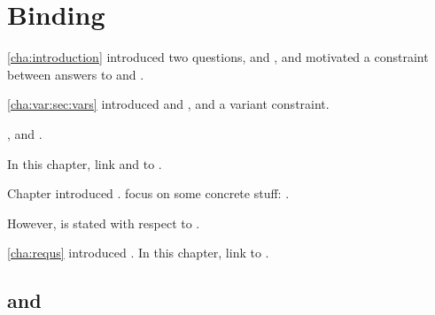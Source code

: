 \chapter{Binding}
\label{cha:binding}

\begin{note}
  \autoref{cha:introduction} introduced two questions, \qWhy{} and \qHow{}, and motivated a constraint between answers to \qWhy{} and \qHow{}.

  \autoref{cha:var:sec:vars} introduced \qWhyV{} and \qHowV{}, and a variant constraint.

  \fc{}, and \requ{}.

  In this chapter, link  and  to \qWhyV{}.
\end{note}

\begin{note}
  Chapter introduced .
   focus on some concrete stuff: .

  However, \qWhyV{} is stated with respect to \ros{}.
\end{note}


\begin{note}
  \autoref{cha:requs} introduced .
  In this chapter, link  to \qWhyV{}.
\end{note}


\section{ and }

